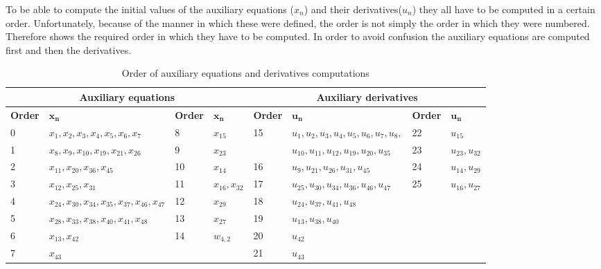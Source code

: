 To be able to compute the initial values of the auxiliary equations ($x_{n}$) and their derivatives($u_{n}$) they all have to be computed in a certain order. Unfortunately, because of the manner in which these were defined, the order is not simply the order in which they were numbered. Therefore  shows the required order in which they have to be computed. In order to avoid confusion the auxiliary equations are computed first and then the derivatives.

\begin{table}[!ht]
\begin{center}
\caption{Order of auxiliary equations and derivatives computations}
\label{tab:calcOrderAuxEq}
\begin{tabular}{|l|l||l|l||l|l||l|l|}
\hline 
\multicolumn{4}{c}{\textbf{Auxiliary equations}} & \multicolumn{4}{c}{\textbf{Auxiliary derivatives}} \\ \hline \hline
\textbf{Order} & $\mathbf{x_{n}}$ &\textbf{Order} & $\mathbf{x_{n}}$ & \textbf{Order} & $\mathbf{u_{n}}$ & \textbf{Order} & $\mathbf{u_{n}}$ \\ \hline 
0 & $ x_{1}, x_{2}, x_{3}, x_{4}, x_{5}, x_{6}, x_{7} $ & 8 & $ x_{15} $ & 15 & $ u_{1}, u_{2}, u_{3}, u_{4}, u_{5}, u_{6}, u_{7}, u_{8},  $ & 22 & $ u_{15} $ \\ \cline{1-4} \cline{7-8}
1 & $ x_{8}, x_{9}, x_{10}, x_{19}, x_{21}, x_{26} $ & 9 & $ x_{23} $ &  & $ u_{10}, u_{11}, u_{12}, u_{19}, u_{20}, u_{35} $ & 23 & $ u_{23}, u_{32} $ \\ \hline
2 & $ x_{11}, x_{20}, x_{36}, x_{45} $ & 10 & $ x_{14} $ & 16 & $ u_{9}, u_{21}, u_{26}, u_{31}, u_{45} $ & 24 & $ u_{14}, u_{29} $ \\ \hline
3 & $ x_{12}, x_{25}, x_{31} $ & 11 &$ x_{16}, x_{32} $ & 17 & $ u_{25}, u_{30}, u_{34}, u_{36}, u_{46}, u_{47} $ & 25 & $ u_{16}, u_{27} $ \\ \hline
4 & $ x_{24}, x_{30}, x_{34}, x_{35}, x_{37}, x_{46}, x_{47} $ & 12 & $ x_{29} $ & 18 & $ u_{24}, u_{37}, u_{41}, u_{48} $ & & $  $ \\ \hline
5 & $ x_{28}, x_{33}, x_{38}, x_{40}, x_{41}, x_{48} $ & 13 & $ x_{27} $ & 19 & $ u_{13}, u_{38}, u_{40} $ & & $  $ \\ \hline
6 & $ x_{13}, x_{42} $ & 14 & $ w_{4,2} $ & 20 & $ u_{42} $ & & $  $ \\ \hline
7 & $ x_{43} $ & & $  $ & 21 & $ u_{43} $ & & $  $ \\ \hline
 
\end{tabular}
\end{center}
\end{table}



